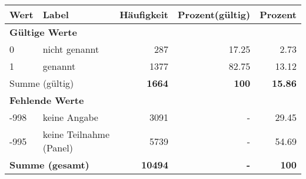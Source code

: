      \begin{longtable}{lXrrr}
     \toprule
     \textbf{Wert} & \textbf{Label} & \textbf{Häufigkeit} & \textbf{Prozent(gültig)} & \textbf{Prozent} \\
     \endhead
     \midrule
     \multicolumn{5}{l}{\textbf{Gültige Werte}}\\

     0 &
     \multicolumn{1}{X}{ nicht genannt   } &


       \num{287} &
       \num[round-mode=places,round-precision=2]{17,25} &
         \num[round-mode=places,round-precision=2]{2,73} \\

     1 &
     \multicolumn{1}{X}{ genannt   } &


       \num{1377} &
       \num[round-mode=places,round-precision=2]{82,75} &
         \num[round-mode=places,round-precision=2]{13,12} \\
     \midrule
     \multicolumn{2}{l}{Summe (gültig)} &
       \textbf{\num{1664}} &
     \textbf{100} &
       \textbf{\num[round-mode=places,round-precision=2]{15,86}} \\
     \multicolumn{5}{l}{\textbf{Fehlende Werte}}\\
       -998 &
       keine Angabe &
         \num{3091} &
        - &
         \num[round-mode=places,round-precision=2]{29,45} \\
       -995 &
       keine Teilnahme (Panel) &
         \num{5739} &
        - &
         \num[round-mode=places,round-precision=2]{54,69} \\
     \midrule
     \multicolumn{2}{l}{\textbf{Summe (gesamt)}} &
          \textbf{\num{10494}} &
        \textbf{-} &
        \textbf{100} \\
     \bottomrule
     \end{longtable}
     
